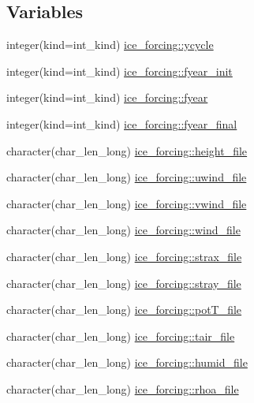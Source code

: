 \subsection*{Variables}
\begin{DoxyCompactItemize}
\item 
integer(kind=int\_\-kind) \hyperlink{namespaceice__forcing_a50c7cbc293e8bdff5e53f79b141e4a9b}{ice\_\-forcing::ycycle}
\item 
integer(kind=int\_\-kind) \hyperlink{namespaceice__forcing_a00220497cafa391e9105c65fad81c982}{ice\_\-forcing::fyear\_\-init}
\item 
integer(kind=int\_\-kind) \hyperlink{namespaceice__forcing_a9e840876f677642389293c4dda357eef}{ice\_\-forcing::fyear}
\item 
integer(kind=int\_\-kind) \hyperlink{namespaceice__forcing_aebf7ee5db66f4a38134d1314a4de3f8f}{ice\_\-forcing::fyear\_\-final}
\item 
character(char\_\-len\_\-long) \hyperlink{namespaceice__forcing_ab619dc21fc4da36e5f02a12ca1e7944d}{ice\_\-forcing::height\_\-file}
\item 
character(char\_\-len\_\-long) \hyperlink{namespaceice__forcing_a807421aa54b1f2f0416c158c1909b5bd}{ice\_\-forcing::uwind\_\-file}
\item 
character(char\_\-len\_\-long) \hyperlink{namespaceice__forcing_a81253ba2712f47539e7e4f1d0d35d885}{ice\_\-forcing::vwind\_\-file}
\item 
character(char\_\-len\_\-long) \hyperlink{namespaceice__forcing_a096f17ea955001c7c2f968e84e0bf5b5}{ice\_\-forcing::wind\_\-file}
\item 
character(char\_\-len\_\-long) \hyperlink{namespaceice__forcing_a49c9fbd4c57cb5e160f88fd18db10938}{ice\_\-forcing::strax\_\-file}
\item 
character(char\_\-len\_\-long) \hyperlink{namespaceice__forcing_a5539f8ddd2633d9b318092daf9745cf9}{ice\_\-forcing::stray\_\-file}
\item 
character(char\_\-len\_\-long) \hyperlink{namespaceice__forcing_aa081200ee80895fd9ca58398d4171467}{ice\_\-forcing::potT\_\-file}
\item 
character(char\_\-len\_\-long) \hyperlink{namespaceice__forcing_ab4ce88faae0d80e903bc827b71109573}{ice\_\-forcing::tair\_\-file}
\item 
character(char\_\-len\_\-long) \hyperlink{namespaceice__forcing_a2a98f60110b3268470cdb52f6b63486c}{ice\_\-forcing::humid\_\-file}
\item 
character(char\_\-len\_\-long) \hyperlink{namespaceice__forcing_a91b13032a46cf179bc526aaacf04608d}{ice\_\-forcing::rhoa\_\-file}

\end{DoxyCompactItemize}
